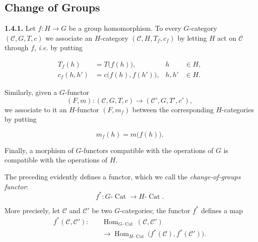 %
\subsection{Change of Groups}

\noindent\textbf{1.4.1.}\quad
Let $f\colon H\to G$ be a group homomorphism. To every $G$-category
$(\mathcal C,G,T,c)$ we associate an $H$-category
$(\mathcal C,H,T_f,c_f)$ by letting $H$ act on $\mathcal C$ through
$f$, \emph{i.e.} by putting

\begin{equation}
  \begin{aligned}
    T_f(h)&=T\bigl(f(h)\bigr),
      & h&\in H,\\
    c_f(h,h')&=c\bigl(f(h),f(h')\bigr),
      & h,h'&\in H.
  \end{aligned}
  \tag{1.4.1.1}
\end{equation}

Similarly, given a $G$-functor
\[
  (F,m)\colon(\mathcal C,G,T,c)
  \longrightarrow(\mathcal C',G,T',c'),
\]
we associate to it an $H$-functor $(F,m_f)$ between the corresponding
$H$-categories by putting

\begin{equation}
  m_f(h)=m\bigl(f(h)\bigr).
  \tag{1.4.1.2}
\end{equation}

Finally, a morphism of $G$-functors compatible with the operations of
$G$ is compatible with the operations of $H$.

The preceding evidently defines a functor, which we call the
\emph{change-of-groups functor}:
\begin{equation}
  f^*\colon G\text{-}\operatorname{Cat}
  \longrightarrow H\text{-}\operatorname{Cat}.
  \tag{1.4.1.3}
\end{equation}

More precisely, let $\mathcal C$ and $\mathcal C'$ be two
$G$-categories; the functor $f^*$ defines a map
\begin{equation}
  \begin{aligned}
    f^*(\mathcal C,\mathcal C')\colon\quad
      &\operatorname{Hom}_{G\text{-}\operatorname{Cat}}
        (\mathcal C,\mathcal C')\\
      &\longrightarrow
        \operatorname{Hom}_{H\text{-}\operatorname{Cat}}
        \bigl(f^*(\mathcal C),f^*(\mathcal C')\bigr).
  \end{aligned}
  \tag{1.4.1.4}
\end{equation}

